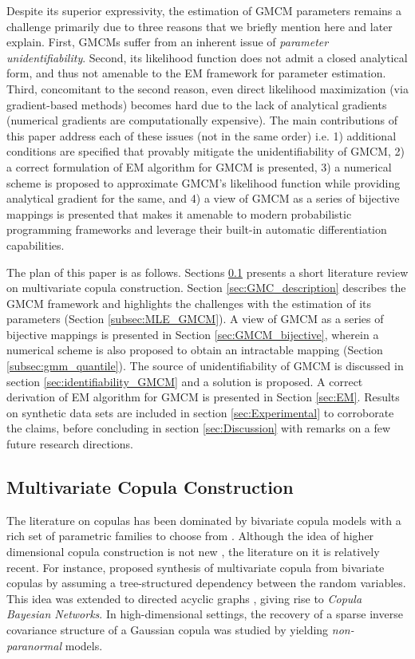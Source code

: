 \documentclass{article}
\theoremstyle{plain}
\theoremstyle{definition}
\theoremstyle{remark}
\begin{document}
Despite its superior expressivity, the estimation of GMCM parameters remains a challenge primarily due to three reasons that we briefly mention here and later explain. First, GMCMs suffer from an inherent issue of \emph{parameter unidentifiability}. Second, its likelihood function does not admit a closed analytical form, and thus not amenable to the EM framework for parameter estimation. Third, concomitant to the second reason, even direct likelihood maximization (via gradient-based methods) becomes hard due to the lack of analytical gradients (numerical gradients are computationally expensive). The main contributions of this paper address each of these issues (not in the same order) i.e. 1) additional conditions are specified that provably mitigate the unidentifiability of GMCM, 2) a correct formulation of EM algorithm for GMCM is presented, 3) a numerical scheme is proposed to approximate GMCM's likelihood function while providing analytical gradient for the same, and 4) a view of GMCM as a series of bijective mappings is presented that makes it amenable to modern probabilistic programming frameworks and leverage their built-in automatic differentiation capabilities.

The plan of this paper is as follows. Sections \ref{subsec:LitReview} presents a short literature review on multivariate copula construction. Section \ref{sec:GMC_description} describes the GMCM framework and highlights the challenges with the estimation of its parameters (Section \ref{subsec:MLE_GMCM}). A view of GMCM as a series of bijective mappings is presented in Section \ref{sec:GMCM_bijective}, wherein a numerical scheme is also proposed to obtain an intractable mapping (Section \ref{subsec:gmm_quantile}). The source of unidentifiability of GMCM is discussed in section \ref{sec:identifiability_GMCM} and a solution is proposed. A correct derivation of EM algorithm for GMCM is presented in Section \ref{sec:EM}. Results on synthetic data sets are included in section \ref{sec:Experimental} to corroborate the claims, before concluding in section \ref{sec:Discussion} with remarks on a few future research directions.

\subsection{Multivariate Copula Construction}\label{subsec:LitReview}
The literature on copulas has been dominated by bivariate copula models with a rich set of parametric families to choose from \citep{Nelsen1999introduction}. Although the idea of higher dimensional copula construction is not new \citep[see][]{Genest1995Multivariate, Joe1993Multivariate,Kojadinovic2010RpackageMVcopula}, the literature on it is relatively recent. For instance, \citet{Bedford2002,Kurowicka2009Book,Czado2010PairCopula} proposed  synthesis of multivariate copula from bivariate copulas by assuming a tree-structured dependency between the random variables. This idea was extended to directed acyclic graphs \citep[see][]{Elidan2010,Hanea2006CBN},  giving rise to \emph{Copula Bayesian Networks}. In high-dimensional settings, the recovery of a sparse inverse covariance structure of a Gaussian copula was studied by \citet{Liu2009} yielding  \emph{non-paranormal} models.
\end{document}
